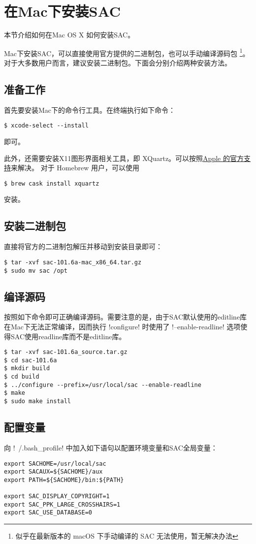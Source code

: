 \section{在Mac下安装SAC}
\label{sec:sac-install-for-mac}
本节介绍如何在Mac OS X 如何安装SAC。

Mac下安装SAC，可以直接使用官方提供的二进制包，也可以手动编译源码包
\footnote{似乎在最新版本的 macOS 下手动编译的 SAC 无法使用，暂无解决办法}。
对于大多数用户而言，建议安装二进制包。下面会分别介绍两种安装方法。

\subsection{准备工作}
首先要安装Mac下的命令行工具。在终端执行如下命令：
\begin{verbatim}
$ xcode-select --install
\end{verbatim}
即可。

此外，还需要安装X11图形界面相关工具，即 XQuartz。可以按照\href{https://support.apple.com/zh-cn/HT201341}{Apple 的官方支持}来解决。
对于 Homebrew 用户，可以使用
\begin{verbatim}
$ brew cask install xquartz
\end{verbatim}
安装。

\subsection{安装二进制包}
直接将官方的二进制包解压并移动到安装目录即可：
\begin{verbatim}
$ tar -xvf sac-101.6a-mac_x86_64.tar.gz
$ sudo mv sac /opt
\end{verbatim}

\subsection{编译源码}
按照如下命令即可正确编译源码。需要注意的是，由于SAC默认使用的editline库
在Mac下无法正常编译，因而执行 !configure! 时使用了
!--enable-readline! 选项使得SAC使用readline库而不是editline库。
\begin{verbatim}
$ tar -xvf sac-101.6a_source.tar.gz
$ cd sac-101.6a
$ mkdir build
$ cd build
$ ../configure --prefix=/usr/local/sac --enable-readline
$ make
$ sudo make install
\end{verbatim}

\subsection{配置变量}
向 !~/.bash_profile! 中加入如下语句以配置环境变量和SAC全局变量：
\begin{verbatim}
export SACHOME=/usr/local/sac
export SACAUX=${SACHOME}/aux
export PATH=${SACHOME}/bin:${PATH}

export SAC_DISPLAY_COPYRIGHT=1
export SAC_PPK_LARGE_CROSSHAIRS=1
export SAC_USE_DATABASE=0
\end{verbatim}

